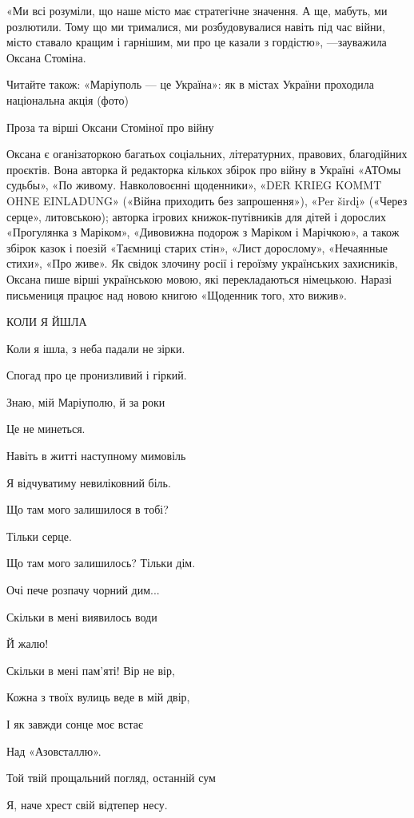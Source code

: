 «Ми всі розуміли, що наше місто має стратегічне значення. А ще, мабуть, ми
розлютили. Тому що ми трималися, ми розбудовувалися навіть під час війни, місто
ставало кращим і гарнішим, ми про це казали з гордістю», —зауважила Оксана
Стоміна.

Читайте також: «Маріуполь — це Україна»: як в містах України проходила
національна акція (фото)

Проза та вірші Оксани Стоміної про війну

Оксана є оганізаторкою багатьох соціальних, літературних, правових, благодійних
проєктів. Вона авторка й редакторка кількох збірок про війну в Україні «АТОмы
судьбы», «По живому. Навколовоєнні щоденники», «DER KRIEG KOMMT OHNE EINLADUNG»
(«Війна приходить без запрошення»), «Per širdį» («Через серце», литовською);
авторка ігрових книжок-путівників для дітей і дорослих «Прогулянка з Маріком»,
«Дивовижна подорож з Маріком і Марічкою», а також збірок казок і поезій
«Таємниці старих стін», «Лист дорослому», «Нечаянные стихи», «Про живе». Як
свідок злочину росії і героїзму українських захисників, Оксана пише вірші
українською мовою, які перекладаються німецькою. Наразі письмениця працює над
новою книгою «Щоденник того, хто вижив». 

КОЛИ Я ЙШЛА

Коли я ішла, з неба падали не зірки.

Спогад про це пронизливий і гіркий.

Знаю, мій Маріуполю, й за роки

Це не минеться.

Навіть в житті наступному мимовіль

Я відчуватиму невиліковний біль.

Що там мого залишилося в тобі?

Тільки серце.

Що там мого залишилось? Тільки дім.

Очі пече розпачу чорний дим...

Скільки в мені виявилось води

Й жалю! 

Скільки в мені пам'яті! Вір не вір,

Кожна з твоїх вулиць веде в мій двір,

І як завжди сонце моє встає

Над «Азовсталлю».

Той твій прощальний погляд, останній сум

Я, наче хрест свій відтепер несу.

